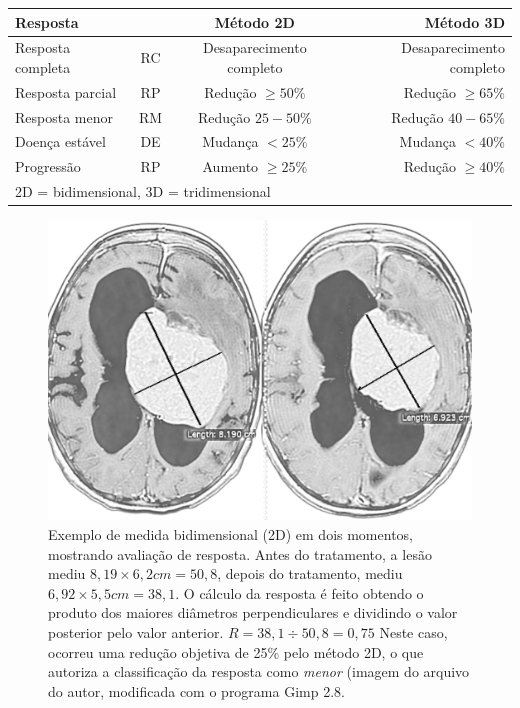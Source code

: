 \documentclass[11pt,a4paper,oldfontcommands]{memoir}
\begin{document}
\begin{table}[h!]
	\begin{center}
		\begin{tabular}{l|c|c r}
			\multicolumn{2}{l}{\textbf{Resposta}} & \textbf{Método 2D} & \textbf{Método 3D}\\
			\hline
			Resposta completa & RC & Desaparecimento completo & Desaparecimento completo\\
			Resposta parcial & RP & Redução $\geq 50\%$ & Redução $\geq 65\%$ \\
			Resposta menor & RM & Redução $25-50\%$ & Redução $40-65\%$ \\
			Doença estável & DE & Mudança $< 25\%$ & Mudança $< 40\%$ \\
			Progressão & RP & Aumento $\geq 25\%$ & Redução $\geq 40\%$ \\
			\hline
			\multicolumn{4}{l}{\small{2D = bidimensional, 3D = tridimensional}}
		\end{tabular}
	\end{center}
\end{table}

\begin{figure}[h!]
	\begin{center}
		\includegraphics[scale=0.3]{fig/fig6.pdf}
		\caption{Exemplo de medida bidimensional (2D) em dois momentos, mostrando avaliação de resposta. Antes do tratamento, a lesão mediu $8,19 \times 6,2 cm = 50,8$, depois do tratamento, mediu $6,92 \times 5,5 cm = 38,1$. O cálculo da resposta é feito obtendo o produto dos maiores diâmetros perpendiculares e dividindo o valor posterior pelo valor anterior. $R = 38,1 \div 50,8 = 0,75$ Neste caso, ocorreu uma redução objetiva de 25\% pelo método 2D, o que autoriza a classificação da resposta como \textit{menor} (imagem do arquivo do autor, modificada com o programa Gimp 2.8.}
	\end{center}
\end{figure}
\end{document}
